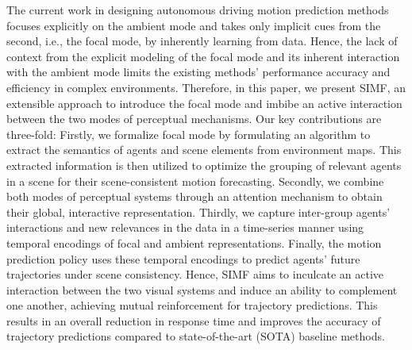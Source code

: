 \documentclass{article}
\begin{document}
The current work in designing autonomous driving motion prediction methods focuses explicitly on the ambient mode and takes only implicit cues from the second, i.e., the focal mode, by inherently learning from data. Hence, the lack of context from the explicit modeling of the focal mode and its inherent interaction with the ambient mode limits the existing methods' performance accuracy and efficiency in complex environments. Therefore, in this paper, we present SIMF, an extensible approach to introduce the focal mode and imbibe an active interaction between the two modes of perceptual mechanisms. Our key contributions are three-fold: Firstly, we formalize focal mode by formulating an algorithm to extract the semantics of agents and scene elements from environment maps. This extracted information is then utilized to optimize the grouping of relevant agents in a scene for their scene-consistent motion forecasting. Secondly, we combine both modes of perceptual systems through an attention mechanism to obtain their global, interactive representation. Thirdly,  we capture inter-group agents' interactions and new relevances in the data in a time-series manner using temporal encodings of focal and ambient representations. Finally, the motion prediction policy uses these temporal encodings to predict agents' future trajectories under scene consistency. Hence, SIMF aims to inculcate an active interaction between the two visual systems and induce an ability to complement one another, achieving mutual reinforcement for trajectory predictions. This results in an overall reduction in response time and improves the accuracy of trajectory predictions compared to state-of-the-art (SOTA) baseline methods. 
\end{document}
